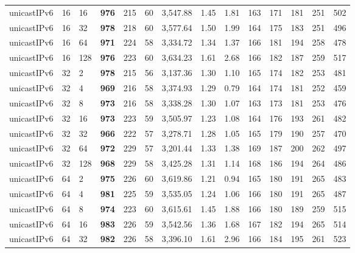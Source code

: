 \begin{table}[!htb]
\begin{tabular}{@{}llllllllllllll@{}}
unicastIPv6 & 16           & 16    & \textbf{976}  & 215  & 60  & 3,547.88 & 1.45     & 1.81     & 163 & 171 & 181 & 251 & 502  \\
unicastIPv6 & 16           & 32    & \textbf{978}  & 218  & 60  & 3,577.64 & 1.50     & 1.99     & 164 & 175 & 183 & 251 & 496  \\
unicastIPv6 & 16           & 64    & \textbf{971}  & 224  & 58  & 3,334.72 & 1.34     & 1.37     & 166 & 181 & 194 & 258 & 478  \\
unicastIPv6 & 16           & 128   & \textbf{976}  & 223  & 60  & 3,634.23 & 1.61     & 2.68     & 166 & 182 & 187 & 259 & 517  \\ \hline
unicastIPv6 & 32           & 2     & \textbf{978}  & 215  & 56  & 3,137.36 & 1.30     & 1.10     & 165 & 174 & 182 & 253 & 481  \\
unicastIPv6 & 32           & 4     & \textbf{969}  & 216  & 58  & 3,374.93 & 1.29     & 0.79     & 164 & 174 & 181 & 252 & 459  \\
unicastIPv6 & 32           & 8     & \textbf{973}  & 216  & 58  & 3,338.28 & 1.30     & 1.07     & 163 & 173 & 181 & 253 & 476  \\
unicastIPv6 & 32           & 16    & \textbf{973}  & 223  & 59  & 3,505.97 & 1.23     & 1.08     & 164 & 176 & 193 & 261 & 482  \\
unicastIPv6 & 32           & 32    & \textbf{966}  & 222  & 57  & 3,278.71 & 1.28     & 1.05     & 165 & 179 & 190 & 257 & 470  \\
unicastIPv6 & 32           & 64    & \textbf{972}  & 229  & 57  & 3,201.44 & 1.33     & 1.38     & 169 & 187 & 200 & 262 & 497  \\
unicastIPv6 & 32           & 128   & \textbf{968}  & 229  & 58  & 3,425.28 & 1.31     & 1.14     & 168 & 186 & 194 & 264 & 486  \\ \hline
unicastIPv6 & 64           & 2     & \textbf{975}  & 226  & 60  & 3,619.86 & 1.21     & 0.94     & 165 & 180 & 191 & 265 & 483  \\
unicastIPv6 & 64           & 4     & \textbf{981}  & 225  & 59  & 3,535.05 & 1.24     & 1.06     & 166 & 180 & 191 & 265 & 487  \\
unicastIPv6 & 64           & 8     & \textbf{974}  & 223  & 60  & 3,615.61 & 1.45     & 1.88     & 166 & 180 & 189 & 259 & 515  \\
unicastIPv6 & 64           & 16    & \textbf{983}  & 226  & 59  & 3,542.56 & 1.36     & 1.68     & 167 & 182 & 194 & 265 & 514  \\
unicastIPv6 & 64           & 32    & \textbf{982}  & 226  & 58  & 3,396.10 & 1.61     & 2.96     & 166 & 184 & 195 & 261 & 523  \\

\end{tabular}
\end{table}
